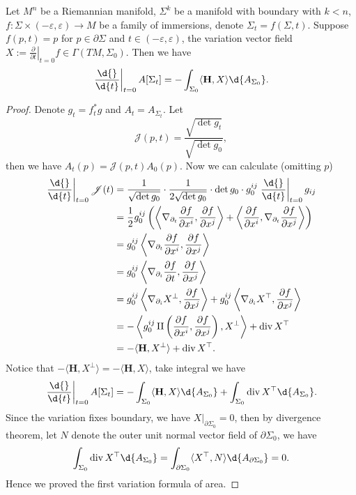 \begin{prop}
    Let $M^n$ be a Riemannian manifold, $\Sigma^k$ be a manifold with boundary with $k<n$, $f:\Sigma\times(-\varepsilon,\varepsilon)\to M$ be a family of immersions, denote $\Sigma_t=f(\Sigma,t)$.
    Suppose $f(p,t)=p$ for $p\in\partial\Sigma$ and $t\in(-\varepsilon,\varepsilon)$, the variation vector field $X:=\left.\frac{\partial}{\partial{t}}\right|_{t=0}f\in\Gamma(TM,\Sigma_0)$.
    Then we have
    \[\left.\frac{\d{}}{\d{t}}\right|_{t=0}A[\Sigma_t]=-\int_{\Sigma_0}\langle\mathbf{H},X\rangle\d{A_{\Sigma_0}}.\]
\end{prop}
\begin{proof}
    Denote $g_t=f^*_tg$ and $A_t=A_{\Sigma_t}$.
    Let
    \[\mathscr{J}(p,t)=\frac{\sqrt{\det{g_t}}}{\sqrt{\det{g_0}}},\]
    then we have $A_t(p)=\mathscr{J}(p,t)A_0(p)$.
    Now we can calculate (omitting $p$)
    \begin{align*}
        \left.\frac{\d{}}{\d{t}}\right|_{t=0}\mathscr{J}(t)&=\frac{1}{\sqrt{\det{g_0}}}\cdot\frac{1}{2\sqrt{\det{g_0}}}\cdot\det{g_0}\cdot g_0^{ij}\left.\frac{\d{}}{\d{t}}\right|_{t=0}g_{ij}\\
        &=\frac{1}{2}g_0^{ij}\left(\left\langle\nabla_{\partial_t}\frac{\partial{f}}{\partial{x^i}},\frac{\partial{f}}{\partial{x^j}}\right\rangle+\left\langle\frac{\partial{f}}{\partial{x^i}},\nabla_{\partial_t}\frac{\partial{f}}{\partial{x^j}}\right\rangle\right)\\
        &=g_0^{ij}\left\langle\nabla_{\partial_t}\frac{\partial{f}}{\partial{x^i}},\frac{\partial{f}}{\partial{x^j}}\right\rangle\\
        &=g_0^{ij}\left\langle\nabla_{\partial_i}\frac{\partial{f}}{\partial{t}},\frac{\partial{f}}{\partial{x^j}}\right\rangle\\
        &=g_0^{ij}\left\langle\nabla_{\partial_i}X^\perp,\frac{\partial{f}}{\partial{x^j}}\right\rangle+g_0^{ij}\left\langle\nabla_{\partial_i}X^\top,\frac{\partial{f}}{\partial{x^j}}\right\rangle\\
        &=-\left\langle g_0^{ij}\II\left(\frac{\partial{f}}{\partial{x^i}},\frac{\partial{f}}{\partial{x^j}}\right),X^\perp\right\rangle+\div{X^\top}\\
        &=-\langle\mathbf{H},X^\perp\rangle+\div{X^\top}.
    \end{align*}
    Notice that $-\langle\mathbf{H},X^\perp\rangle=-\langle\mathbf{H},X\rangle$, take integral we have
    \[\left.\frac{\d{}}{\d{t}}\right|_{t=0}A[\Sigma_t]=-\int_{\Sigma_0}\langle\mathbf{H},X\rangle\d{A_{\Sigma_0}}+\int_{\Sigma_0}\div{X^\top}\d{A_{\Sigma_0}}.\]
    Since the variation fixes boundary, we have $X|_{\partial\Sigma_0}=0$, then by divergence theorem, let $N$ denote the outer unit normal vector field of $\partial\Sigma_0$, we have
    \[\int_{\Sigma_0}\div{X^\top}\d{A_{\Sigma_0}}=\int_{\partial\Sigma_0}\langle X^\top,N\rangle\d{A_{\partial\Sigma_0}}=0.\]
    Hence we proved the first variation formula of area.
\end{proof}

